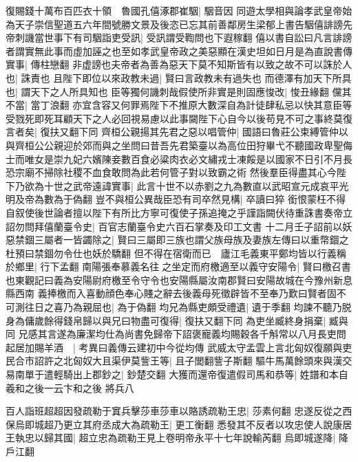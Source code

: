 復賜錢十萬布百匹衣十領　魯國孔僖涿郡崔駰|{
	駰音因}
同遊太學相與論孝武皇帝始為天子崇信聖道五六年間號勝文景及後恣已忘其前善鄰房生梁郁上書告駰僖誹謗先帝刺譏當世事下有司駰詣吏受訊|{
	受訊謂受鞫問也下遐稼翻}
僖以書自訟曰凡言誹謗者謂實無此事而虛加誣之也至如孝武皇帝政之美惡顯在漢史坦如日月是為直說書傳實事|{
	傳柱戀翻}
非虚謗也夫帝者為善為惡天下莫不知斯皆有以致之故不可以誅於人也|{
	誅責也}
且陛下即位以來政教未過|{
	賢曰言政教未有過失也}
而德澤有加天下所具也|{
	謂天下之人所具知也}
臣等獨何譏刺哉假使所非實是則固應悛改|{
	悛丑緣翻}
儻其不當|{
	當丁浪翻}
亦宜含容又何罪焉陛下不推原大數深自為計徒肆私忌以快其意臣等受戮死即死耳顧天下之人必回視易慮以此事闚陛下心自今以後苟見不可之事終莫復言者矣|{
	復扶又翻下同}
齊桓公親揚其先君之惡以唱管仲|{
	國語曰魯莊公束縛管仲以與齊桓公公親迎於郊而與之坐問曰昔吾先君築臺以為高位田狩畢弋不聽國政卑聖侮士而唯女是崇九妃六嬪陳妾數百食必粱肉衣必文繡戎士凍餒是以國家不日引不月長恐宗廟不掃除社稷不血食敢問為此若何管子對以致霸之術}
然後羣臣得盡其心今陛下乃欲為十世之武帝遠諱實事|{
	此言十世不以赤劉之九為數直以武昭宣元成哀平光明及帝為數為于偽翻}
豈不與桓公異哉臣恐有司卒然見構|{
	卒讀曰猝}
銜恨蒙枉不得自叙使後世論者擅以陛下有所比方寧可復使子孫追掩之乎謹詣闕伏待重誅書奏帝立詔勿問拜僖蘭臺令史|{
	百官志蘭臺令史六百石掌奏及印工文書}
十二月壬子詔前以妖惡禁錮三屬者一皆蠲除之|{
	賢曰三屬即三族也謂父族母族及妻族左傳曰以重幣錮之杜預曰禁錮勿令仕也妖於驕翻}
但不得在宿衛而已　廬江毛義東平鄭均皆以行義稱於鄉里|{
	行下孟翻}
南陽張奉慕義名往之坐定而府檄適至以義守安陽令|{
	賢曰檄召書也東觀記曰義為安陽尉府檄至令守令也安陽縣屬汝南郡賢曰安陽故城在今豫州新息縣西南}
義捧檄而入喜動顔色奉心賤之辭去後義母死徵辟皆不至奉乃歎曰賢者固不可測往日之喜乃為親屈也|{
	為于偽翻}
均兄為縣吏頗受禮遺|{
	遺于季翻}
均諫不聽乃脱身為傭歲餘得錢帛歸以與兄曰物盡可復得|{
	復扶又翻下同}
為吏坐臧終身捐棄|{
	臧與同}
兄感其言遂為廉潔均仕為尚書免歸帝下詔褒寵義均賜穀各千斛常以八月長吏問起居加賜羊酒　|{
	考異曰義傳云建初中今從均傳}
武威太守孟雲上言北匈奴復願與吏民合市詔許之北匈奴大且渠伊莫訾王等|{
	且子閭翻訾子斯翻}
驅牛馬萬餘頭來與漢交易南單于遣輕騎出上郡鈔之|{
	鈔楚交翻}
大獲而還帝復遣假司馬和恭等|{
	姓譜和本自羲和之後一云卞和之後}
將兵八

百人詣班超超因發疏勒于窴兵擊莎車莎車以賂誘疏勒王忠|{
	莎素何翻}
忠遂反從之西保烏即城超乃更立其府丞成大為疏勒王|{
	更工衡翻}
悉發其不反者以攻忠使人說康居王執忠以歸其國|{
	超立忠為疏勒王見上卷明帝永平十七年說輸芮翻}
烏即城遂降|{
	降戶江翻}


